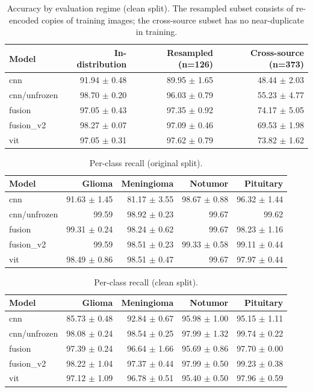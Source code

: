 \begin{table}[t]
\centering
\begin{tabular}{lrrr}
\toprule
Model & In-distribution & Resampled (n=126) & Cross-source (n=373) \\
\midrule
cnn & 91.94 $\pm$ 0.48 & 89.95 $\pm$ 1.65 & 48.44 $\pm$ 2.03 \\
cnn/unfrozen & 98.70 $\pm$ 0.20 & 96.03 $\pm$ 0.79 & 55.23 $\pm$ 4.77 \\
fusion & 97.05 $\pm$ 0.43 & 97.35 $\pm$ 0.92 & 74.17 $\pm$ 5.05 \\
fusion_v2 & 98.27 $\pm$ 0.07 & 97.09 $\pm$ 0.46 & 69.53 $\pm$ 1.98 \\
vit & 97.05 $\pm$ 0.31 & 97.62 $\pm$ 0.79 & 73.82 $\pm$ 1.62 \\
\bottomrule
\end{tabular}
\caption{Accuracy by evaluation regime (clean split). The resampled subset consists of re-encoded copies of training images; the cross-source subset has no near-duplicate in training.}
\label{tab:regimes_clean}
\end{table}

\begin{table}[t]
\centering
\begin{tabular}{lrrrr}
\toprule
Model & Glioma & Meningioma & Notumor & Pituitary \\
\midrule
cnn & 91.63 $\pm$ 1.45 & 81.17 $\pm$ 3.55 & 98.67 $\pm$ 0.88 & 96.32 $\pm$ 1.44 \\
cnn/unfrozen & 99.59 & 98.92 $\pm$ 0.23 & 99.67 & 99.62 \\
fusion & 99.31 $\pm$ 0.24 & 98.24 $\pm$ 0.62 & 99.67 & 98.23 $\pm$ 1.16 \\
fusion_v2 & 99.59 & 98.51 $\pm$ 0.23 & 99.33 $\pm$ 0.58 & 99.11 $\pm$ 0.44 \\
vit & 98.49 $\pm$ 0.86 & 98.51 $\pm$ 0.47 & 99.67 & 97.97 $\pm$ 0.44 \\
\bottomrule
\end{tabular}
\caption{Per-class recall (original split).}
\label{tab:recall_original}
\end{table}

\begin{table}[t]
\centering
\begin{tabular}{lrrrr}
\toprule
Model & Glioma & Meningioma & Notumor & Pituitary \\
\midrule
cnn & 85.73 $\pm$ 0.48 & 92.84 $\pm$ 0.67 & 95.98 $\pm$ 1.00 & 95.15 $\pm$ 1.11 \\
cnn/unfrozen & 98.08 $\pm$ 0.24 & 98.54 $\pm$ 0.25 & 97.99 $\pm$ 1.32 & 99.74 $\pm$ 0.22 \\
fusion & 97.39 $\pm$ 0.24 & 96.64 $\pm$ 1.66 & 95.69 $\pm$ 0.86 & 97.70 $\pm$ 0.00 \\
fusion_v2 & 98.22 $\pm$ 1.04 & 97.37 $\pm$ 0.44 & 97.99 $\pm$ 0.50 & 99.23 $\pm$ 0.38 \\
vit & 97.12 $\pm$ 1.09 & 96.78 $\pm$ 0.51 & 95.40 $\pm$ 0.50 & 97.96 $\pm$ 0.59 \\
\bottomrule
\end{tabular}
\caption{Per-class recall (clean split).}
\label{tab:recall_clean}
\end{table}

